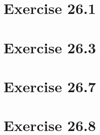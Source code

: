 \documentclass{article}
\begin{document}
\section*{Exercise 26.1}



\section*{Exercise 26.3}



\section*{Exercise 26.7}



\section*{Exercise 26.8}


\end{document}
